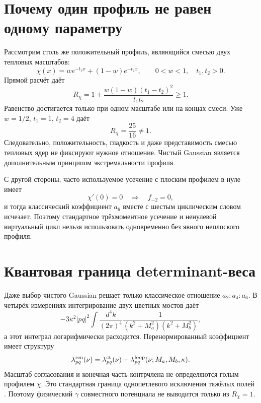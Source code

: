 \section{Почему один профиль не равен одному параметру}

Рассмотрим столь же положительный профиль, являющийся смесью двух тепловых
масштабов:
\begin{equation}
 \chi(x)=w e^{-t_1x}+(1-w)e^{-t_2x},
 \qquad 0<w<1,\quad t_1,t_2>0.
 \label{eq:v7-common-profile-two-scale-mixture}
\end{equation}
Прямой расчёт даёт
\begin{equation}
 R_\chi
 =1+\frac{w(1-w)(t_1-t_2)^2}{t_1t_2}\ge1.
 \label{eq:v7-common-profile-mixture-ratio}
\end{equation}
Равенство достигается только при одном масштабе или на концах смеси. Уже
$w=1/2$, $t_1=1$, $t_2=4$ даёт
\begin{equation}
 R_\chi=\frac{25}{16}\ne1.
 \label{eq:v7-common-profile-mixture-benchmark}
\end{equation}
Следовательно, положительность, гладкость и даже представимость смесью
тепловых ядер не фиксируют нужное отношение. Чистый Gaussian является
дополнительным принципом экстремальности профиля.

С другой стороны, часто используемое усечение с плоским профилем в нуле
имеет
\begin{equation}
 \chi'(0)=0\quad\Longrightarrow\quad f_{-2}=0,
 \label{eq:v7-common-profile-flat-branch}
\end{equation}
и тогда классический коэффициент $a_6$ вместе с шестым циклическим словом
исчезает. Поэтому стандартное трёхмоментное усечение и ненулевой виртуальный
цикл нельзя использовать одновременно без явного неплоского профиля.

\section{Квантовая граница determinant-веса}

Даже выбор чистого Gaussian решает только классическое отношение
$a_2:a_4:a_6$. В четырёх измерениях интегрирование двух цветных мостов даёт
\begin{equation}
 -3\kappa^2|pq|^2
 \int\frac{d^4k}{(2\pi)^4}
 \frac1{(k^2+M_a^2)(k^2+M_b^2)},
 \label{eq:v7-common-profile-loop-integral}
\end{equation}
а этот интеграл логарифмически расходится. Перенормированный коэффициент
имеет структуру
\begin{equation}
 \lambda_{pq}^{\rm ren}(\nu)
 =\lambda_{pq}^{\rm ct}(\nu)
 +\lambda_{pq}^{\rm loop}(\nu;M_a,M_b,\kappa).
 \label{eq:v7-common-profile-renormalized-vertex}
\end{equation}
Масштаб согласования и конечная часть контрчлена не определяются голым
профилем $\chi$. Это стандартная граница однопетлевого исключения тяжёлых
полей \cite{v7-common-profile-hlm,v7-common-profile-dittmaier}. Поэтому
физический $\gamma$ совместного потенциала не выводится только из
$R_\chi=1$.

